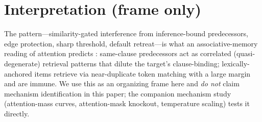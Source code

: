 \section{Interpretation (frame only)}
\label{sec:interpretation}

The pattern---similarity-gated interference from inference-bound predecessors, edge protection, sharp
threshold, default retreat---is what an associative-memory reading of attention predicts
\citep{ramsauer2020hopfield, bietti2023birth}: same-clause predecessors act as correlated (quasi-degenerate)
retrieval patterns that dilute the target's clause-binding; lexically-anchored items retrieve via
near-duplicate token matching \citep{olsson2022induction} with a large margin and are immune. We use this as
an organizing frame here and \emph{do not} claim mechanism identification in this paper; the companion
mechanism study (attention-mass curves, attention-mask knockout, temperature scaling) tests it directly.
